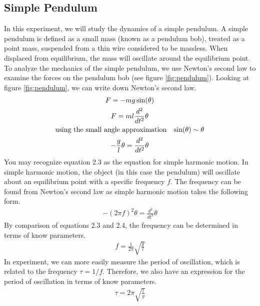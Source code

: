 \subsection{Simple Pendulum}
In this experiment, we will study the dynamics of a simple pendulum. A simple pendulum is defined as a small mass (known as a pendulum bob), treated as a point mass, suspended from a thin wire considered to be massless. When displaced from equilibrium, the mass will oscillate around the equilibrium point. To analyze the mechanics of the simple pendulum, we use Newton's second law to examine the forces on the pendulum bob (see figure \ref{fig:pendulum}).
\myskip
Looking at figure \ref{fig:pendulum}, we can write down Newton's second law.
\begin{gather}
F = -mg\sin(\theta) \\
F = ml \frac{d^2}{dt^2}\theta \\
\text{using the small angle approximation} \hspace{3mm} \sin(\theta) \sim \theta \nonumber \\
-\frac{g}{l} \theta = \frac{d^2}{dt^2}\theta
\end{gather}
You may recognize equation 2.3 as the equation for simple harmonic motion. In simple harmonic motion, the object (in this case the pendulum) will oscillate about an equilibrium point with a specific frequency $f$. The frequency can be found from Newton's second law as simple harmonic motion takes the following form.
\begin{gather}
-(2\pi f)^2 \theta = \frac{d^2}{dt^2}\theta
\end{gather}
By comparison of equations 2.3 and 2.4, the frequency can be determined in terms of know parameters.
\begin{gather}
f = \frac{1}{2\pi}\sqrt{\frac{g}{l}}
\end{gather}
In experiment, we can more easily measure the period of oscillation, which is related to the frequency $\tau = 1/f$. Therefore, we also have an expression for the period of oscillation in terms of know parameters.
\begin{gather}
\tau=2\pi \sqrt{\frac{l}{g}}
\end{gather}

